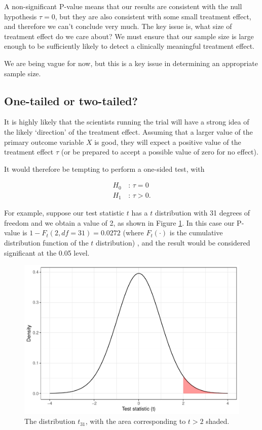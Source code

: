 \documentclass[
  openany]{book}
\theoremstyle{definition}
\theoremstyle{definition}
\theoremstyle{definition}
\theoremstyle{definition}
\theoremstyle{remark}
\begin{document}
A non-significant P-value means that our results are consistent with the null hypothesis \(\tau=0\), but they are also consistent with some small treatment effect, and therefore we can't conclude very much. The key issue is, what size of treatment effect do we care about? We must ensure that our sample size is large enough to be sufficiently likely to detect a clinically meaningful treatment effect.

We are being vague for now, but this is a key issue in determining an appropriate sample size.

\subsection{One-tailed or two-tailed?}\label{one-tailed-or-two-tailed}

It is highly likely that the scientists running the trial will have a strong idea of the likely `direction' of the treatment effect. Assuming that a larger value of the primary outcome variable \(X\) is good, they will expect a positive value of the treatment effect \(\tau\) (or be prepared to accept a possible value of zero for no effect).

It would therefore be tempting to perform a one-sided test, with

\begin{align*}
  H_0\,&:\, \tau=0\\
  H_1\,&:\, \tau>0.
\end{align*}

For example, suppose our test statistic \(t\) has a \(t\) distribution with 31 degrees of freedom and we obtain a value of 2, as shown in Figure \ref{fig:t31-onesided}.
In this case our P-value is \(1 - F_t\left(2, df=31\right)= 0.0272\) (where \(F_t\left(\cdot\right)\) is the cumulative distribution function of the \(t\) distribution) , and the result would be considered significant at the 0.05 level.

\begin{figure}
\centering
\includegraphics{CT4H_notes_files/figure-latex/t31-onesided-1.pdf}
\caption{\label{fig:t31-onesided}The distribution \(t_{31}\), with the area corresponding to \(t > 2\) shaded.}
\end{figure}
\end{document}
